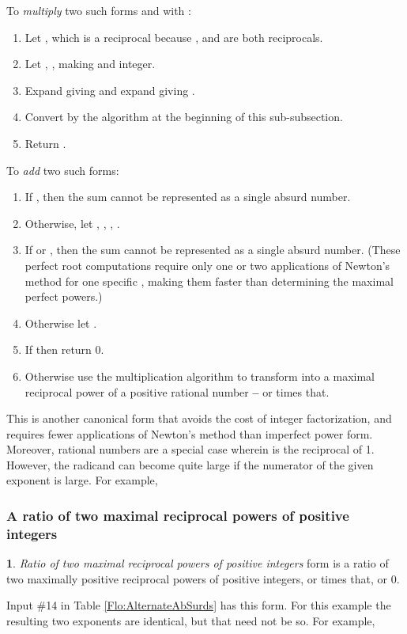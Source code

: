 \documentclass[12pt,english]{article}
\theoremstyle{definition}
\newtheorem*{defn*}{\protect\definitionname}
\theoremstyle{remark}
\theoremstyle{plain}
\theoremstyle{plain}
\providecommand{\definitionname}{Definition}
\begin{document}
To \textsl{multiply} two such forms  and
 with :
\begin{enumerate}
\item Let , which is a reciprocal
because , and  are both reciprocals.
\item Let , ,
making  and  integer.
\item Expand  giving  and expand 
giving .
\item Convert  by the algorithm
at the beginning of this sub-subsection.
\item Return .
\end{enumerate}
To \textsl{add} two such forms:
\begin{enumerate}
\item If , then the sum cannot be represented
as a single absurd number.
\item Otherwise, let , ,
, .
\item If  or ,
then the sum cannot be represented as a single absurd number. (These
perfect root computations require only one or two applications of
Newton's method for one specific , making them faster than determining
the maximal perfect powers.)
\item Otherwise let .
\item If  then return 0.
\item Otherwise use the multiplication algorithm to transform 
into a maximal reciprocal power of a positive rational number \textbf{--}
or {\small } times that.
\end{enumerate}
This is another canonical form that avoids the cost of integer factorization,
and requires fewer applications of Newton's method than imperfect
power form. Moreover, rational numbers are a special case wherein
 is the reciprocal of 1. However, the radicand can become
quite large if the numerator of the given exponent is large. For example,




\subsubsection{A ratio of two maximal reciprocal powers of positive integers}
\begin{defn*}
\textsl{Ratio of two maximal reciprocal powers of positive integers}
form is a ratio of two maximally positive reciprocal powers of positive
integers, or {\small } times that, or 0.
\end{defn*}
Input \#14 in Table \ref{Flo:AlternateAbSurds} has this form. For
this example the resulting two exponents are identical, but that need
not be so. For example,
\end{document}
